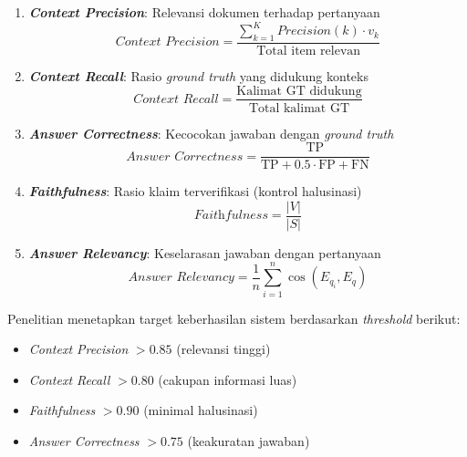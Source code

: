 \begin{enumerate}[label=\textbf{\arabic*.}, leftmargin=*, itemsep=10pt]
          \begin{enumerate}[label=\arabic*., leftmargin=0.75cm, itemsep=3pt]

              \item \textbf{\textit{Context Precision}}: Relevansi dokumen terhadap pertanyaan
                    \begin{equation}
                        \textit{Context Precision} = \frac{\sum_{k=1}^{K} \textit{Precision}(k) \cdot v_k}{\text{Total item relevan}}
                    \end{equation}

              \item \textbf{\textit{Context Recall}}: Rasio \textit{ground truth} yang didukung konteks
                    \begin{equation}
                        \textit{Context Recall} = \frac{\text{Kalimat GT didukung}}{\text{Total kalimat GT}}
                    \end{equation}

              \item \textbf{\textit{Answer Correctness}}: Kecocokan jawaban dengan \textit{ground truth}
                    \begin{equation}
                        \textit{Answer Correctness} = \frac{\text{TP}}{\text{TP} + 0.5 \cdot \text{FP} + \text{FN}}
                    \end{equation}

              \item \textbf{\textit{Faithfulness}}: Rasio klaim terverifikasi (kontrol halusinasi)
                    \begin{equation}
                        \textit{Faithfulness} = \frac{|V|}{|S|}
                    \end{equation}

              \item \textbf{\textit{Answer Relevancy}}: Keselarasan jawaban dengan pertanyaan
                    \begin{equation}
                        \textit{Answer Relevancy} = \frac{1}{n} \sum_{i=1}^{n} \cos(E_{q_i}, E_q)
                    \end{equation}

          \end{enumerate}
          Penelitian menetapkan target keberhasilan sistem berdasarkan \textit{threshold} berikut:
          \begin{itemize}[leftmargin=0.75cm]
              \item \textit{Context Precision} $> 0.85$ (relevansi tinggi)
              \item \textit{Context Recall} $> 0.80$ (cakupan informasi luas)
              \item \textit{Faithfulness} $> 0.90$ (minimal halusinasi)
              \item \textit{Answer Correctness} $> 0.75$ (keakuratan jawaban)
          \end{itemize}


\end{enumerate}
